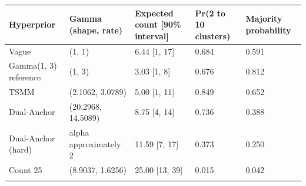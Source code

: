 \begin{longtable}{lllll}
\toprule
Hyperprior & Gamma (shape, rate) & Expected count [90\% interval] & Pr(2 to 10 clusters) & Majority probability \\
\midrule\endhead
Vague & (1, 1) & 6.44 [1, 17] & 0.684 & 0.591 \\ \addlinespace[3pt]
Gamma(1, 3) reference & (1, 3) & 3.03 [1, 8] & 0.676 & 0.812 \\ \addlinespace[3pt]
TSMM & (2.1062, 3.0789) & 5.00 [1, 11] & 0.849 & 0.652 \\ \addlinespace[3pt]
Dual-Anchor & (20.2968, 14.5089) & 8.75 [4, 14] & 0.736 & 0.388 \\ \addlinespace[3pt]
Dual-Anchor (hard) & alpha approximately 2 & 11.59 [7, 17] & 0.373 & 0.250 \\ \addlinespace[3pt]
Count 25 & (8.9037, 1.6256) & 25.00 [13, 39] & 0.015 & 0.042 \\ \addlinespace[3pt]
\bottomrule\end{longtable}

